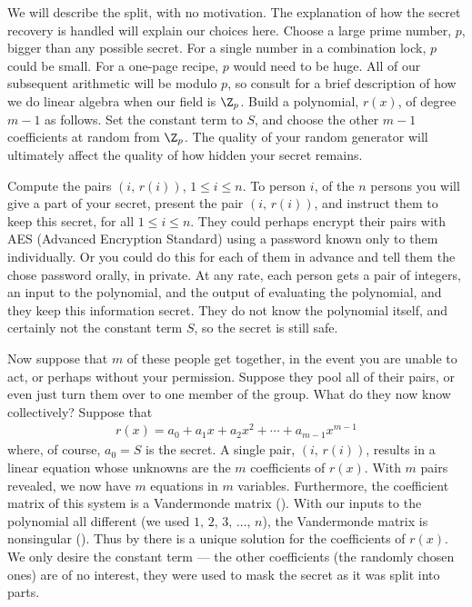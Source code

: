 %
We will describe the split, with no motivation.  The explanation of how the secret recovery is handled will explain our choices here.  Choose a large prime number, $p$, bigger than any possible secret.  For a single number in a combination lock, $p$ could be small.  For a one-page recipe, $p$ would need to be huge.  All of our subsequent arithmetic will be modulo $p$, so consult  for a brief description of how we do linear algebra when our field is $\Z_p$.  Build a polynomial, $r(x)$, of degree $m-1$ as follows.  Set the constant term to $S$, and choose the other $m-1$ coefficients at random from $\Z_p$.  The quality of your random generator will ultimately affect the quality of how hidden your secret remains.\par
%
Compute the pairs $(i,\,r(i))$, $1\leq i\leq n$.  To person $i$, of the $n$ persons you will give a part of your secret, present the pair $(i,\,r(i))$, and instruct them to keep this secret, for all $1\leq i\leq n$.  They could perhaps encrypt their pairs with AES (Advanced Encryption Standard) using a password known only to them individually.  Or you could do this for each of them in advance and tell them the chose password orally, in private.  At any rate, each person gets a pair of integers, an input to the polynomial, and the output of evaluating the polynomial, and they keep this information secret.  They do not know the polynomial itself, and certainly not the constant term $S$, so the secret is still safe.\par
%
Now suppose that $m$ of these people get together, in the event you are unable to act, or perhaps without your permission.  Suppose they pool all of their pairs, or even just turn them over to one member of the group.  What do they now know collectively?  Suppose that
%
\begin{align*}
r(x)=a_0+a_1x+a_2x^2+\cdots+a_{m-1}x^{m-1}
\end{align*}
%
where, of course, $a_0=S$ is the secret.  A single pair, $(i,\,r(i))$, results in a linear equation whose unknowns are the $m$ coefficients of $r(x)$.  With $m$ pairs revealed, we now have $m$ equations in $m$ variables.  Furthermore, the coefficient matrix of this system is a Vandermonde matrix ().  With our inputs to the polynomial all different (we used $1,\,2,\,3,\,\ldots,\,n$), the Vandermonde matrix is nonsingular ().  Thus by  there is a unique solution for the coefficients of $r(x)$.  We only desire the constant term --- the other coefficients (the randomly chosen ones) are of no interest, they were used to mask the secret as it was split into parts.\par
